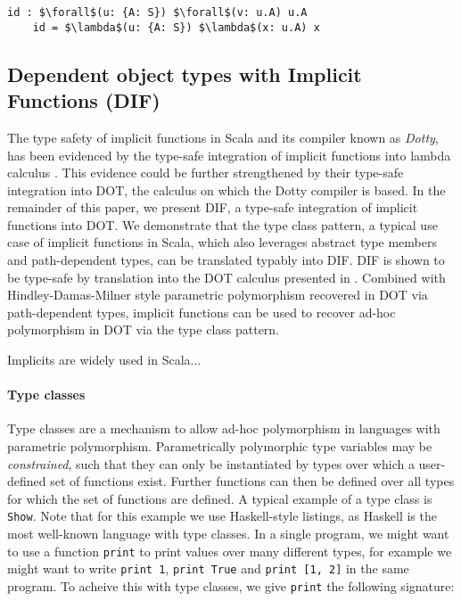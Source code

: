 \begin{minipage}{\linewidth}
\begin{lstlisting}[mathescape]
    id : $\forall$(u: {A: S}) $\forall$(v: u.A) u.A
    id = $\lambda$(u: {A: S}) $\lambda$(x: u.A) x
\end{lstlisting}
\end{minipage}

\subsection{Dependent object types with Implicit Functions (DIF)}

The type safety of implicit functions in Scala and its compiler known as
\emph{Dotty}, has been evidenced by the type-safe integration of implicit
functions into lambda calculus \cite{OBLB18}. This evidence could be further
strengthened by their type-safe integration into DOT, the calculus on which the
Dotty compiler is based. In the remainder of this paper, we present DIF, a
type-safe integration of implicit functions into DOT. We demonstrate that the
type class pattern, a typical use case of implicit functions in Scala, which
also leverages abstract type members and path-dependent types, can be translated
typably into DIF. DIF is shown to be type-safe by translation into the DOT
calculus presented in \cite{AGORS16}. Combined with Hindley-Damas-Milner style
parametric polymorphism recovered in DOT via path-dependent types, implicit
functions can be used to recover ad-hoc polymorphism in DOT via the type class
pattern.

Implicits are widely used in Scala... 

\paragraph{Type classes} Type classes \cite{K88, WB89} are a mechanism to allow
ad-hoc polymorphism in languages with parametric polymorphism. Parametrically
polymorphic type variables may be \emph{constrained}, such that they can only be
instantiated by types over which a user-defined set of functions exist. Further
functions can then be defined over all types for which the set of functions are
defined. A typical example of a type class is \texttt{Show}. Note that for this
example we use Haskell-style listings, as Haskell is the most well-known
language with type classes. In a single program, we might want to use a
function \texttt{print} to print values over many different types, for example
we might want to write \texttt{print 1}, \texttt{print True} and \texttt{print
[1, 2]} in the same program. To acheive this with type classes, we give
\texttt{print} the following signature:

